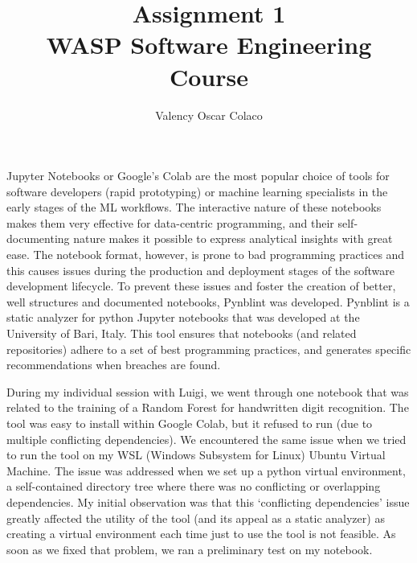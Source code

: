 \documentclass[11pt]{article}
\begin{document}
 
\title{\textbf{Assignment 1}\\WASP Software Engineering Course}
\author{Valency Oscar Colaco}
\maketitle

\par{Jupyter Notebooks or Google’s Colab are the most popular choice of tools for software developers (rapid prototyping) or machine learning specialists in the early stages of the ML workflows. The interactive nature of these notebooks makes them very effective for data-centric programming, and their self-documenting nature makes it possible to express analytical insights with great ease. The notebook format, however, is prone to bad programming practices and this causes issues during the production and deployment stages of the software development lifecycle. To prevent these issues and foster the creation of better, well structures and documented notebooks, Pynblint was developed. Pynblint is a static analyzer for python Jupyter notebooks that was developed at the University of Bari, Italy. This tool ensures that notebooks (and related repositories) adhere to a set of best programming practices, and generates specific recommendations when breaches are found.}
\\
\par{During my individual session with Luigi, we went through one notebook that was related to the training of a Random Forest for handwritten digit recognition. The tool was easy to install within Google Colab, but it refused to run (due to multiple conflicting dependencies). We encountered the same issue when we tried to run the tool on my WSL (Windows Subsystem for Linux) Ubuntu Virtual Machine. The issue was addressed when we set up a python virtual environment, a self-contained directory tree where there was no conflicting or overlapping dependencies. My initial observation was that this ‘conflicting dependencies’ issue greatly affected the utility of the tool (and its appeal as a static analyzer) as creating a virtual environment each time just to use the tool is not feasible. As soon as we fixed that problem, we ran a preliminary test on my notebook.} 
\\
\end{document}
